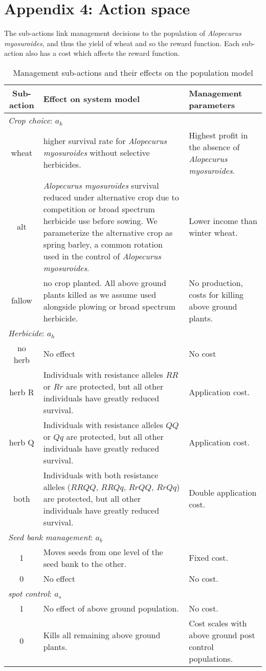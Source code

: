 \documentclass[12pt, a4paper]{article}
\begin{document}
\section*{Appendix 4: Action space}
The sub-actions link management decisions to the population of \textit{Alopecurus myosuroides}, and thus the yield of wheat and so the reward function. Each sub-action also has a cost which affects the reward function.   
\begin{longtable}[h]{c p{9cm} p{4cm}}
\caption{Management sub-actions and their effects on the population model\label{table:actions}}\\
	\hline
	\textbf{Sub-action} & \textbf{Effect on system model} & \textbf{Management parameters}\\
	\hline	
	\multicolumn{3}{l}{\textit{Crop choice}: $a_k$}\\
	wheat & higher survival rate for \textit{Alopecurus myosuroides} without selective herbicides. & Highest profit in the absence of \textit{Alopecurus myosuroides}. \\
	alt & \textit{Alopecurus myosuroides} survival reduced under alternative crop due to competition or broad spectrum herbicide use before sowing. We parameterize the alternative crop as spring barley, a common rotation used in the control of \textit{Alopecurus myosuroides}. & Lower income than winter wheat.\\
	fallow & no crop planted. All above ground plants killed as we assume used alongside plowing or broad spectrum herbicide. & No production, costs for killing above ground plants.\\
	\multicolumn{3}{l}{\textit{Herbicide}: $a_h$}\\
	no herb & No effect & No cost\\ 
	herb R & Individuals with resistance alleles $RR$ or $Rr$ are protected, but all other individuals have greatly reduced survival. & Application cost.\\
	herb Q & Individuals with resistance alleles $QQ$ or $Qq$ are protected, but all other individuals have greatly reduced survival. & Application cost.\\  
	both & Individuals with both resistance alleles ($RRQQ$, $RRQq$, $RrQQ$, $RrQq$) are protected, but all other individuals have greatly reduced survival. & Double application cost.\\  
	\multicolumn{3}{l}{\textit{Seed bank management}: $a_b$}\\
	1 & Moves seeds from one level of the seed bank to the other. & Fixed cost.\\
	0 & No effect & No cost.\\
	\multicolumn{3}{l}{\textit{spot control}: $a_s$}\\
	1 & No effect of above ground population. & No cost.\\
	0 & Kills all remaining above ground plants. & Cost scales with above ground post control populations. \\
	\hline
\end{longtable}
\end{document}
